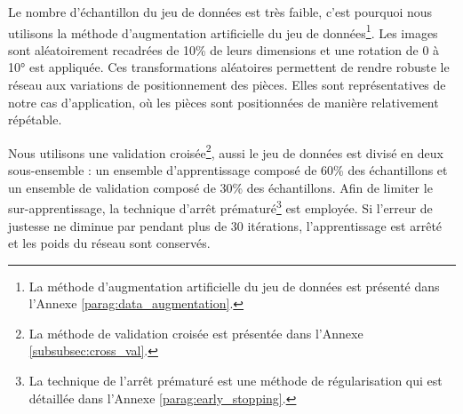 Le nombre d'échantillon du jeu de données est très faible, c'est pourquoi nous utilisons la méthode d'augmentation artificielle du jeu de données\footnote{La méthode d'augmentation artificielle du jeu de données est présenté dans l'Annexe \ref{parag:data_augmentation}.}.
Les images sont aléatoirement recadrées de 10\% de leurs dimensions et une rotation de 0 à 10° est appliquée.
Ces transformations aléatoires permettent de rendre robuste le réseau aux variations de positionnement des pièces.
Elles sont représentatives de notre cas d'application, où les pièces sont positionnées de manière relativement répétable.

Nous utilisons une validation croisée\footnote{La méthode de validation croisée est présentée dans l'Annexe \ref{subsubsec:cross_val}.}, aussi le jeu de données est divisé en deux sous-ensemble : un ensemble d'apprentissage composé de 60\% des échantillons et un ensemble de validation composé de 30\% des échantillons.
Afin de limiter le sur-apprentissage, la technique d'arrêt prématuré\footnote{La technique de l'arrêt prématuré est une méthode de régularisation qui est détaillée dans l'Annexe \ref{parag:early_stopping}.} est employée.
Si l'erreur de justesse ne diminue par pendant plus de 30 itérations, l'apprentissage est arrêté et les poids du réseau sont conservés.
